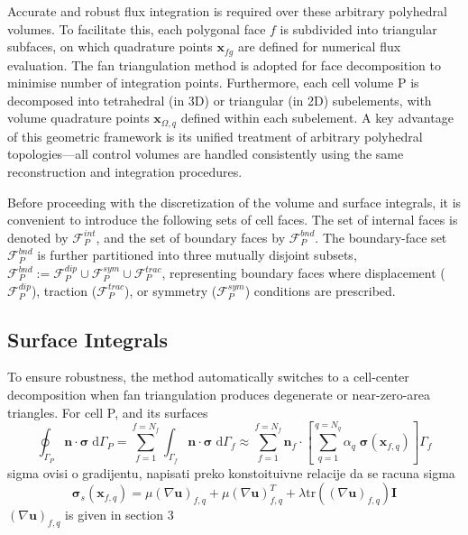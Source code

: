 \documentclass[sn-mathphys,Numbered]{sn-jnl}%
\newcommand{\bb}{\boldsymbol}
\begin{document}
%
Accurate and robust flux integration is required over these arbitrary polyhedral volumes. 
To facilitate this, each polygonal face $f$ is subdivided into triangular subfaces, 
on which quadrature points $\bb{x}_{fg}$ are defined for numerical flux evaluation.
The fan triangulation method is adopted for face decomposition to minimise number of integration points.
Furthermore, each cell volume P is decomposed into tetrahedral
(in 3D) or triangular (in 2D) subelements, with volume quadrature points $\mathbf{x}_{\Omega,q}$ defined within each subelement.
A key advantage of this geometric framework is its unified treatment of arbitrary polyhedral topologies—all control 
volumes are handled consistently using the same reconstruction and integration procedures. 

Before proceeding with the discretization of the volume and surface integrals, it is convenient to introduce the following sets of cell faces.
 The set of internal faces is denoted by $\mathcal{F}_P^{int}$, and the set of boundary faces by $\mathcal{F}_P^{bnd}$.
The boundary-face set $\mathcal{F}_P^{bnd}$ is further partitioned into three mutually disjoint subsets,
$\mathcal{F}_P^{bnd} := \mathcal{F}_P^{dip} \cup \mathcal{F}_P^{sym} \cup \mathcal{F}_P^{trac}$,
representing boundary faces where displacement ($\mathcal{F}_P^{dip}$), traction ($\mathcal{F}_P^{trac}$),
 or symmetry ($\mathcal{F}_P^{sym}$) conditions are prescribed.
%
\subsection{Surface Integrals}
\label{sec:vol_int}
%
To ensure robustness, the method automatically switches to a cell-center decomposition when fan triangulation 
produces degenerate or near-zero-area triangles. 
For cell P, and its surfaces
\begin{equation}
\oint_{\Gamma_P} \bb{n} \cdot \bb{\sigma} \; \text{d}\Gamma_P 
= 
\sum_{f=1}^{f=N_f} \int_{\Gamma_f} \bb{n} \cdot \bb{\sigma} \; \text{d}\Gamma_f
\approx
\sum_{f=1}^{f=N_f} \bb{n}_{f} \cdot \left [ \sum_{q=1}^{q=N_q}\alpha_q \; \bb{\sigma}(\bb{x}_{f,q}) \right]\Gamma_f
\end{equation}
sigma ovisi o gradijentu, napisati preko konstoituivne relacije da se racuna sigma
\begin{equation}
\bb{\sigma}_s(\bb{x}_{f,q}) =   \mu (\nabla \bb{u})_{f,q} + \mu (\nabla \bb{u})^T_{f,q} +\lambda \text{tr}((\nabla \bb{u})_{f,q} )\mathbf{I}
\end{equation}
$(\nabla \bb{u})_{f,q}$ is given in section 3
%
\end{document}
